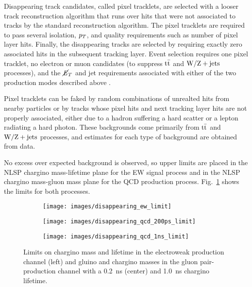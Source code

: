 \documentclass[12pt]{article}
\begin{document}
        Disappearing track candidates, called pixel tracklets, are selected with a looser track reconstruction algorithm that runs over hits that were not associated to tracks by the standard reconstruction algorithm. The pixel tracklets are required to pass several isolation, $p_T$, and quality requirements such as number of pixel layer hits. Finally, the disappearing tracks are selected by requiring exactly zero associated hits in the subsequent tracking layer. Event selection requires one pixel tracklet, no electron or muon candidates (to suppress $\mathrm{t}\bar{\mathrm{t}}$ and $\mathrm{W}/\mathrm{Z} + \mathrm{jets}$ processes), and the $\cancel{\it{E}}_{T}$ and jet requirements associated with either of the two production modes described above .
        
        Pixel tracklets can be faked by random combinations of unrealted hits from nearby particles or by tracks whose pixel hits and next tracking layer hits are not properly associated, either due to a hadron suffering a hard scatter or a lepton radiating a hard photon. These backgrounds come primarily from $\mathrm{t}\bar{\mathrm{t}}$ and $\mathrm{W}/\mathrm{Z} + \mathrm{jets}$ processes, and estimates for each type of background are obtained from data. 

        No excess over expected background is observed, so upper limits are placed in the NLSP chargino mass-lifetime plane for the EW signal process and in the NLSP chargino mass-gluon mass plane for the QCD production process. Fig.~\ref{disappearing_limits} shows the limits for both processes.

        \noindent \begin{figure}[htbp] \begin{center}
        \begin{subfigure}[htbp]{0.3\textwidth} \begin{center}
        \texttt{[image: images/disappearing\_ew\_limit]}
        \end{center} \end{subfigure}
        \begin{subfigure}[htbp]{0.3\textwidth} \begin{center}
        \texttt{[image: images/disappearing\_qcd\_200ps\_limit]}
        \end{center} \end{subfigure}
        \begin{subfigure}[htbp]{0.3\textwidth} \begin{center}
        \texttt{[image: images/disappearing\_qcd\_1ns\_limit]}
        \end{center} \end{subfigure}
            \caption{Limits on chargino mass and lifetime in the electroweak production channel (left) and gluino and chargino masses in the gluon pair-production channel with a \SI{0.2}{\nano\s} (center) and \SI{1.0}{\nano\s} chargino lifetime.~\cite{atlas_disappearing}}
        \label{disappearing_limits}
        \end{center} \end{figure}
\end{document}
